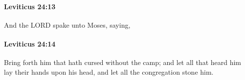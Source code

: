 		\paragraph{Leviticus 24:13} %
			\label{LEVITICUS-24-13}

			And the LORD spake unto Moses, saying,


		\paragraph{Leviticus 24:14} %
			\label{LEVITICUS-24-14}

			Bring forth him that hath cursed without the camp; and let all that heard him lay their hands upon his head, and let all the congregation stone him.


